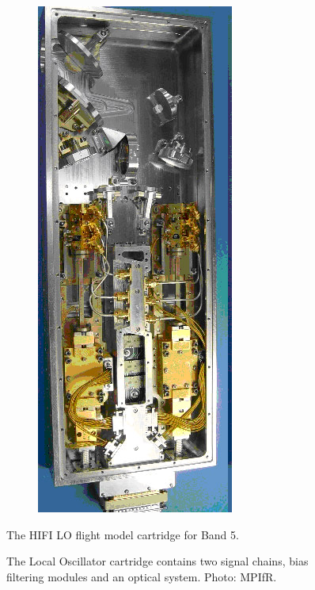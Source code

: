 \begin{figure}[hbtp]
\begin{subfigure}[c]{.22\textwidth}
        \includegraphics[width=\textwidth]{lou_band_5}%
    \end{subfigure}%
    \caption{The HIFI LO flight model cartridge for Band 5.}
    \caption*{
        The Local Oscillator cartridge contains two signal chains,
        bias filtering modules and an optical system.
        Photo: MPIfR.
    }
    \label{fig:photo_hifi_lou}
\end{figure}

